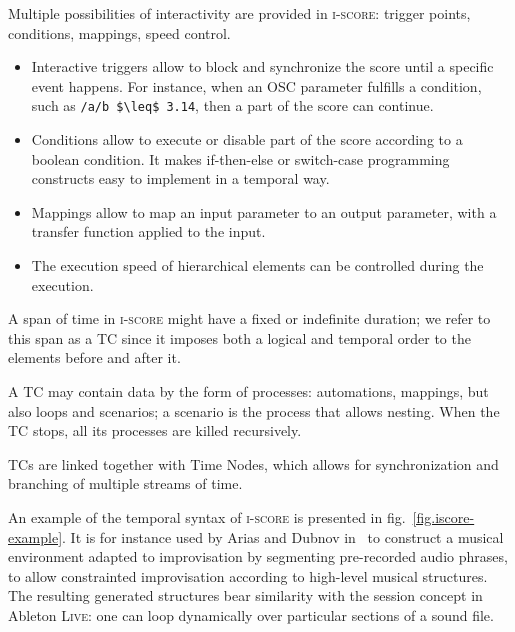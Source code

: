 \documentclass{article}
\newcommand*{\iscore}{\textsc{i-score}\xspace}
\newcommand*{\abletonlive}{Ableton \textsc{Live}\xspace}
\newcommand*{\timeconstraint}{\ac{TC}\xspace}
\newcommand*{\timeconstraints}{\acp{TC}\xspace}
\begin{document}
Multiple possibilities of interactivity are provided in \iscore: trigger points, conditions, 
mappings, speed control.
\begin{itemize}
    \item Interactive triggers allow to block and synchronize the score until a specific event happens.
    For instance, when an OSC parameter fulfills a condition, such as  \lstinline[mathescape]!/a/b $\leq$ 3.14!, then 
    a part of the score can continue.
    \item Conditions allow to execute or disable part of the score according to a boolean condition.
    It makes if-then-else or switch-case programming constructs easy to implement in a temporal way.
    \item Mappings allow to map an input parameter to an output parameter, with a transfer function applied to the input.
    \item The execution speed of hierarchical elements can be controlled during the execution.
\end{itemize}

A span of time in \iscore might have a fixed or indefinite duration;
we refer to this span as a \timeconstraint since it imposes both a logical and temporal order to the elements before and after it.
 
A \timeconstraint may contain data by the form of processes: automations, mappings, but also loops and scenarios; a scenario is the process that allows nesting. 
When the \timeconstraint stops, all its processes are killed recursively.

\timeconstraints are linked together with Time Nodes, which allows for synchronization and branching of multiple streams of time.

An example of the temporal syntax of \iscore is presented in fig.~\ref{fig.iscore-example}.
It is for instance used by Arias and Dubnov in~\cite{Arias:VMO-Score} to construct a musical environment adapted to improvisation by segmenting pre-recorded audio phrases, to allow constrainted improvisation according to high-level musical structures.
The resulting generated structures bear similarity with the session concept in \abletonlive: one can loop dynamically over particular sections of a sound file. 
\end{document}
